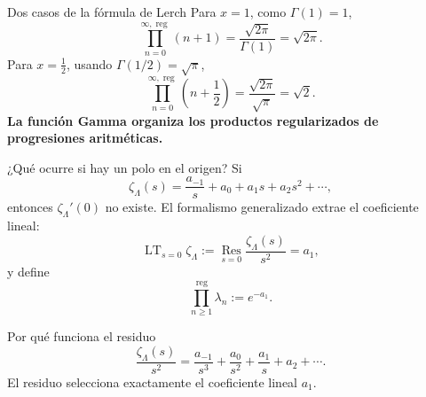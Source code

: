 \documentclass[aspectratio=169,11pt]{beamer}
\newcommand{\reg}{\operatorname{reg}}
\newcommand{\Res}{\operatorname*{Res}}
\newcommand{\highlight}[1]{\textcolor{UdeAGreen}{\bfseries #1}}
\begin{document}
\begin{frame}{Dos casos de la fórmula de Lerch}
  Para $x=1$, como $\Gamma(1)=1$,
  \[
    \prod_{n=0}^{\infty\!,\reg}(n+1)
      =\frac{\sqrt{2\pi}}{\Gamma(1)}=\sqrt{2\pi}.
  \]
  \pause
  Para $x=\tfrac12$, usando $\Gamma(1/2)=\sqrt\pi$,
  \[
    \prod_{n=0}^{\infty\!,\reg}\left(n+\frac12\right)
      =\frac{\sqrt{2\pi}}{\sqrt\pi}=\sqrt2.
  \]
  \pause
  \centering\highlight{La función Gamma organiza los productos regularizados de progresiones aritméticas.}
\end{frame}

\begin{frame}[t]{¿Qué ocurre si hay un polo en el origen?}
  \small
  Si
  \[
    \zeta_\Lambda(s)=\frac{a_{-1}}{s}+a_0+a_1s+a_2s^2+\cdots,
  \]
  \pause
  entonces $\zeta_\Lambda'(0)$ no existe. El formalismo generalizado extrae el
  coeficiente lineal:
  \[
    \operatorname{LT}_{s=0}\zeta_\Lambda
      :=\Res_{s=0}\frac{\zeta_\Lambda(s)}{s^2}=a_1,
  \]
  \pause
  y define
  \[
    \prod_{n\ge1}^{\reg}\lambda_n:=e^{-a_1}.
  \]
  \pause
  \begin{block}{Por qué funciona el residuo}
    \[
      \frac{\zeta_\Lambda(s)}{s^2}
      =\frac{a_{-1}}{s^3}+\frac{a_0}{s^2}+\frac{a_1}{s}+a_2+\cdots.
    \]
    El residuo selecciona exactamente el coeficiente lineal $a_1$.
  \end{block}
\end{frame}
\end{document}
